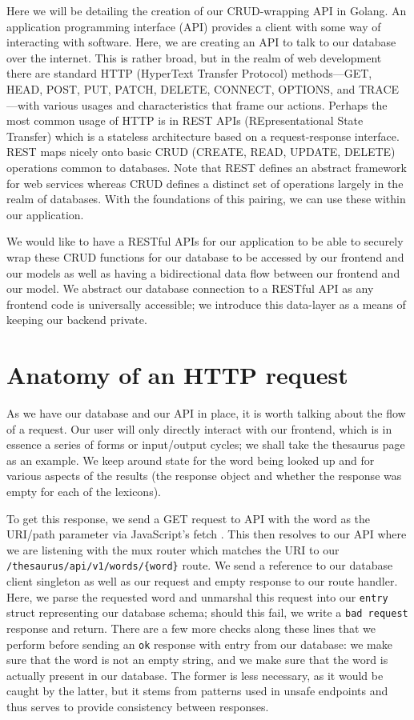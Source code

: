 \documentclass[11pt, twoside, reqno]{book}
\begin{document}
Here we will be detailing the creation of our CRUD-wrapping API in Golang. An application programming interface (API) provides a client with some way of  interacting with software. Here, we are creating an API to talk to our database over the internet. This is rather broad, but in the realm of web development there are standard HTTP (HyperText Transfer Protocol) methods—GET, HEAD, POST, PUT, PATCH, DELETE, CONNECT, OPTIONS, and TRACE—with various usages and characteristics that frame our actions. Perhaps the most common usage of HTTP is in REST APIs (REpresentational State Transfer) which is a stateless architecture based on a request-response interface. REST maps nicely onto basic CRUD (CREATE, READ, UPDATE, DELETE) operations common to databases. Note that REST defines an abstract framework for web services whereas CRUD defines a distinct set of operations largely in the realm of databases. With the foundations of this pairing, we can use these within our application.

We would like to have a RESTful APIs for our application to be able to securely wrap these CRUD functions for our database to be accessed by our frontend and our models as well as having a bidirectional data flow between our frontend and our model. We abstract our database connection to a RESTful API as any frontend code is universally accessible; we introduce this data-layer as a means of keeping our backend private.

\section{Anatomy of an HTTP request}

As we have our database and our API in place, it is worth talking about the flow of a request. Our user will only directly interact with our frontend, which is in essence a series of forms or input/output cycles; we shall take the thesaurus page as an example. We keep around state for the word being looked up and for various aspects of the results (the response object and whether the response was empty for each of the lexicons).

To get this response, we send a GET request to API with the word as the URI/path parameter via JavaScript's fetch \cite{FetchAPI36:online}. This then resolves to our API where we are listening with the mux router \cite{muxGoril57:online} which matches the URI to our \texttt{/thesaurus/api/v1/words/\{word\}} route. We send a reference to our database client singleton as well as our request and empty response to our route handler. Here, we parse the requested word and unmarshal this request into our \texttt{entry} struct representing our database schema; should this fail, we write a \texttt{bad request} response and return. There are a few more checks along these lines that we perform before sending an \texttt{ok} response with entry from our database: we make sure that the word is not an empty string, and we make sure that the word is actually present in our database. The former is less necessary, as it would be caught by the latter, but it stems from patterns used in unsafe \cite{SafeMDNW66:online} endpoints and thus serves to provide consistency between responses.
\end{document}

